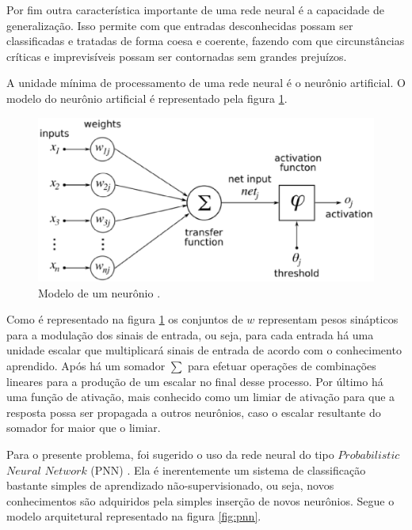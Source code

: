 Por fim outra característica importante de uma rede neural é a capacidade de generalização. Isso permite com que entradas desconhecidas possam ser classificadas e tratadas de forma coesa e coerente, fazendo com que circunstâncias críticas e imprevisíveis possam ser contornadas sem grandes prejuízos. 

A unidade mínima de processamento de uma rede neural é o neurônio artificial. O modelo do neurônio artificial é representado pela figura \ref{fig_neuronio}.

\begin{figure}[h]
	\centering
		\includegraphics[scale=0.7]{figuras/neuron.eps}
	\caption{Modelo de um neurônio \cite{haykin2009neural}.}
	\label{fig_neuronio}
\end{figure}

Como é representado na figura \ref{fig_neuronio} os conjuntos de $w$ representam pesos sinápticos para a modulação dos sinais de entrada, ou seja, para cada entrada há uma unidade escalar que multiplicará sinais de entrada de acordo com o conhecimento aprendido. Após há um somador $\sum$ para efetuar operações de combinações lineares para a produção de um escalar no final desse processo. Por último há uma função de ativação, mais conhecido como um limiar de ativação para que a resposta possa ser propagada a outros neurônios, caso o escalar resultante do somador for maior que o limiar.

Para o presente problema, foi sugerido o uso da rede neural do tipo $Probabilistic$ $Neural$ $Network$ (PNN) \cite{specht1990probabilistic}. Ela é inerentemente um sistema de classificação bastante simples de aprendizado não-supervisionado, ou seja, novos conhecimentos são adquiridos pela simples inserção de novos neurônios. Segue o modelo arquitetural representado na figura \ref{fig:pnn}.

